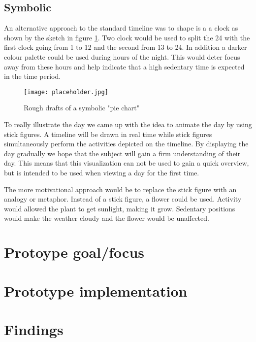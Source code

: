 \subsection{Symbolic}
An alternative approach to the standard timeline was to shape is a a clock as shown by the sketch in figure \ref{fig:clock}. Two clock would be used to split the 24 with the first clock going from 1 to 12 and the second from 13 to 24. In addition a darker colour palette could be used during hours of the night. This would deter focus away from these hours and help indicate that a high sedentary time is expected in the time period.

\begin{figure}[h!]
	\centering
		\texttt{[image: placeholder.jpg]}
		\caption{\footnotesize Rough drafts of a symbolic "pie chart"}
		\label{fig:clock}
\end{figure}

To really illustrate the day we came up with the idea to animate the day by using stick figures. A timeline will be drawn in real time while stick figures simultaneously perform the activities depicted on the timeline. By displaying the day gradually we hope that the subject will gain a firm understanding of their day. This means that this visualization can not be used to gain a quick overview, but is intended to be used when viewing a day for the first time.

The more motivational approach would be to replace the stick figure with an analogy or metaphor. Instead of a stick figure, a flower could be used. Activity would allowed the plant to get sunlight, making it grow. Sedentary positions would make the weather cloudy and the flower would be unaffected.



\section{Protoype goal/focus}

\section{Prototype implementation}

\section{Findings}